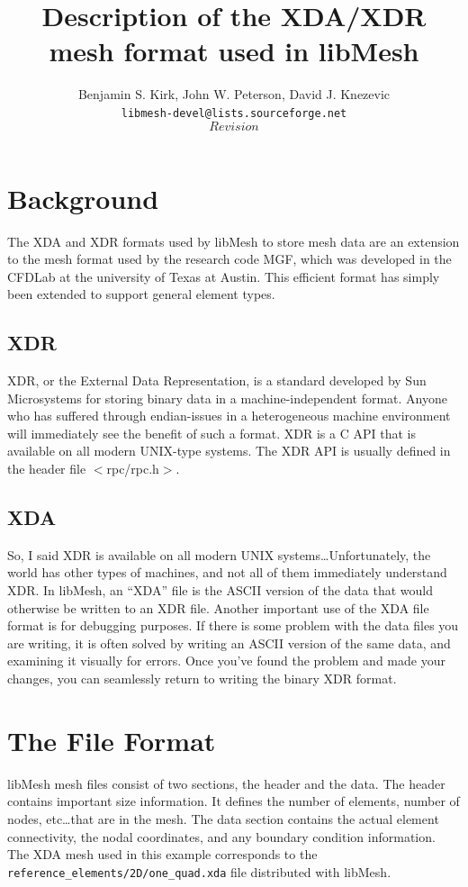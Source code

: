 \documentclass[12pt]{article}
\begin{document}
\title{Description of the XDA/XDR mesh format used in libMesh}
\author{Benjamin S. Kirk, John W. Peterson, David J. Knezevic \\
        \texttt{libmesh-devel@lists.sourceforge.net} \\
	$$Revision$$}
\maketitle

\section{Background}
The XDA and XDR formats used by libMesh to store mesh data are an extension to the mesh format used by the research code MGF, which was developed in the CFDLab at the university of Texas at Austin.  This efficient format has simply been extended to support general element types.

\subsection{XDR}
XDR, or the External Data Representation, is a standard developed by Sun Microsystems for storing binary data in a machine-independent format.  Anyone who has suffered through endian-issues in a heterogeneous machine environment will immediately see the benefit of such a format.  XDR is a C API that is available on all modern UNIX-type systems.  The XDR API is usually defined in the header file $<$rpc/rpc.h$>$.

\subsection{XDA}
So, I said XDR is available on all modern UNIX systems\ldots Unfortunately, the world has other types of machines, and not all of them immediately understand XDR.  In libMesh, an ``XDA'' file is the ASCII version of the data that would otherwise be written to an XDR file.  Another important use of the XDA file format is for debugging purposes.  If there is some problem with the data files you are writing, it is often solved by writing an ASCII version of the same data, and examining it visually for errors.  Once you've found the problem and made your changes, you can seamlessly return to writing the binary XDR format.

\section{The File Format}
libMesh mesh files consist of two sections, the header and the data.  The header contains important size information.  It defines the number of elements, number of nodes, etc\ldots that are in the mesh.  The data section contains the actual element connectivity, the nodal coordinates, and any boundary condition information.  The XDA mesh used in this example corresponds to the \texttt{reference\_elements/2D/one\_quad.xda} file distributed with libMesh.
\end{document}
